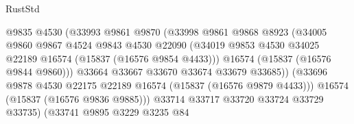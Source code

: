 \begin{lexlean}{RustStd}
\begin{coremodule}
{\begin{coremodule}
{{{{{{{{{{{{{{{{{{{{{{{{{{{{{{{{{{{{{{{{{{{{{{{{{{{{{{{{{{{{                                        @9835
                                        @4530
                                        (@33993
                                          @9861
                                          @9870
                                          (@33998
                                            @9861
                                            @9868
                                            @8923
                                            (@34005
                                              @9860
                                              @9867
                                              @4524
                                              @9843
                                              @4530
                                              @22090
                                              (@34019
                                                @9853
                                                @4530
                                                @34025
                                                @22189
                                                @16574
                                                (@15837 (@16576 @9854 @4433)))
                                              @16574
                                              (@15837 (@16576 @9844 @9860)))
                                            @33664
                                            @33667
                                            @33670
                                            @33674
                                            @33679
                                            @33685))
                                        (@33696
                                          @9878
                                          @4530
                                          @22175
                                          @22189
                                          @16574
                                          (@15837 (@16576 @9879 @4433)))
                                        @16574
                                        (@15837 (@16576 @9836 @9885)))
                                      @33714
                                      @33717
                                      @33720
                                      @33724
                                      @33729
                                      @33735)
                                    (@33741
                                      @9895
                                      @3229
                                      @3235
                                      @84
}}}}}}}}}}}}}}}}}}}}}}}}}}}}}}}}}}}}}}}}}}}}}}}}}}}}}}}}}}}}
\end{coremodule}}
\end{coremodule}
\end{lexlean}
